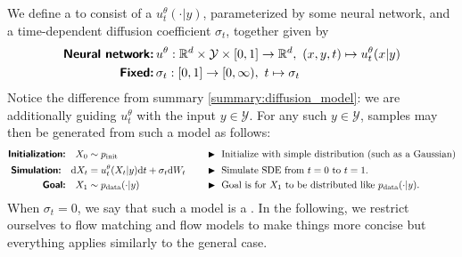 
We define a  to consist of a  $u_t^{\theta}(\cdot | y)$, parameterized by some neural network, and a time-dependent diffusion coefficient $\sigma_t$, together given by
\begin{align*}
    \textbf{\sffamily Neural network:}&\, u^\theta: \mathbb{R}^d \times \mathcal{Y} \times [0,1] \to \mathbb{R}^d,\,\, (x,y,t) \mapsto u_t^{\theta}(x|y)\\
    \textbf{\sffamily Fixed:}&\, \sigma_t: [0,1] \to [0,\infty),\,\, t \mapsto \sigma_t
\end{align*}
Notice the difference from summary \ref{summary:diffusion_model}: we are additionally guiding $u_t^\theta$ with the input $y\in \mathcal{Y}$. For any such $y \in  \mathcal{Y}$, samples may then be generated from such a model as follows:
\begin{align*}
    \textbf{\sffamily Initialization:}\quad X_0&\sim\pinit \quad  &&\blacktriangleright\,\,\text{Initialize with simple distribution (such as a Gaussian)}\\
    \textbf{\sffamily Simulation:}\quad \dd X_t &= u_t^\theta(X_t|y)\dd t + \sigma_t\dd W_t\quad &&\blacktriangleright\,\,\text{Simulate SDE from $t=0$ to $t=1$.}\\
    \textbf{\sffamily Goal:}\quad X_1 &\sim  \pdata(\cdot | y) \quad &&\blacktriangleright\,\,\text{Goal is for $X_1$ to be distributed like $\pdata(\cdot|y)$.}
\end{align*}
When $\sigma_t = 0$, we say that such a model is a . In the following, we restrict ourselves to flow matching and flow models to make things more concise but everything applies similarly to the general case.

